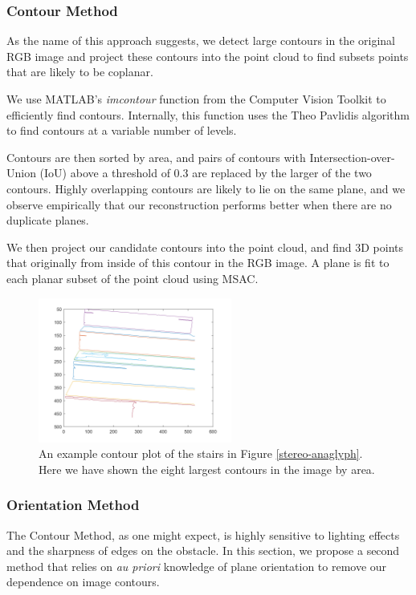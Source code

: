 \subsubsection{Contour Method} \label{contour-method}

As the name of this approach suggests, we detect large contours in the original RGB image and project these contours into the point cloud to find subsets points that are likely to be coplanar.

We use MATLAB's \textit{imcontour} function from the Computer Vision Toolkit to efficiently find contours. Internally, this function uses the Theo Pavlidis algorithm \cite{pavlidis} to find contours at a variable number of levels.

Contours are then sorted by area, and pairs of contours with Intersection-over-Union (IoU) above a threshold of 0.3 are replaced by the larger of the two contours. Highly overlapping contours are likely to lie on the same plane, and we observe empirically that our reconstruction performs better when there are no duplicate planes.

We then project our candidate contours into the point cloud, and find 3D points that originally from inside of this contour in the RGB image. A plane is fit to each planar subset of the point cloud using MSAC.

\begin{figure}[!h]
\centering
\includegraphics[width=2.5in]{Sections/Figures/good_contour_plot_12-7.png}
\caption{An example contour plot of the stairs in Figure \ref{stereo-anaglyph}. Here we have shown the eight largest contours in the image by area.}
\label{contours-example}
\end{figure}

\subsubsection{Orientation Method} \label{orient-method}

The Contour Method, as one might expect, is highly sensitive to lighting effects and the sharpness of edges on the obstacle. In this section, we propose a second method that relies on \textit{au priori} knowledge of plane orientation to remove our dependence on image contours.

